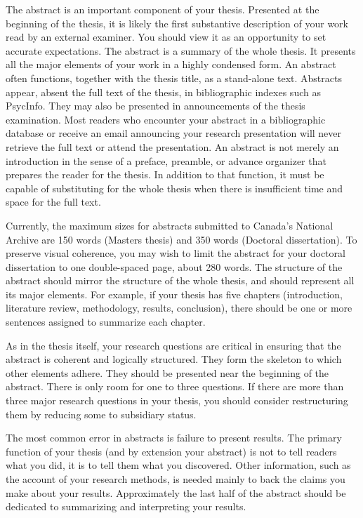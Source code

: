 
\begin{abstract*}

The abstract is an important component of your thesis. Presented at the beginning of the thesis, it is likely the first substantive description of your work read by an external examiner. You should view it as an opportunity to set accurate expectations.
The abstract is a summary of the whole thesis. It presents all the major elements of your work in a highly condensed form.
An abstract often functions, together with the thesis title, as a stand-alone text. Abstracts appear, absent the full text of the thesis, in bibliographic indexes such as PsycInfo. They may also be presented in announcements of the thesis examination. Most readers who encounter your abstract in a bibliographic database or receive an email announcing your research presentation will never retrieve the full text or attend the presentation.
An abstract is not merely an introduction in the sense of a preface, preamble, or advance organizer that prepares the reader for the thesis. In addition to that function, it must be capable of substituting for the whole thesis when there is insufficient time and space for the full text.

Currently, the maximum sizes for abstracts submitted to Canada's National Archive are 150 words (Masters thesis) and 350 words (Doctoral dissertation).
To preserve visual coherence, you may wish to limit the abstract for your doctoral dissertation to one double-spaced page, about 280 words.
The structure of the abstract should mirror the structure of the whole thesis, and should represent all its major elements.
For example, if your thesis has five chapters (introduction, literature review, methodology, results, conclusion), there should be one or more sentences assigned to summarize each chapter.

As in the thesis itself, your research questions are critical in ensuring that the abstract is coherent and logically structured. They form the skeleton to which other elements adhere.
They should be presented near the beginning of the abstract.
There is only room for one to three questions. If there are more than three major research questions in your thesis, you should consider restructuring them by reducing some to subsidiary status.

The most common error in abstracts is failure to present results.
The primary function of your thesis (and by extension your abstract) is not to tell readers what you did, it is to tell them what you discovered. Other information, such as the account of your research methods, is needed mainly to back the claims you make about your results.
Approximately the last half of the abstract should be dedicated to summarizing and interpreting your results.

\end{abstract*}


